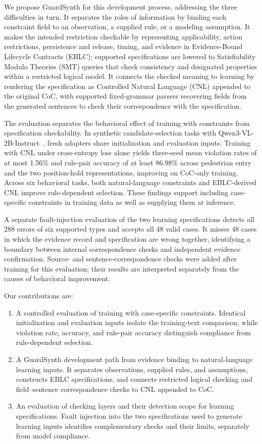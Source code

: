We propose GuardSynth for this development process, addressing the three
difficulties in turn. It separates the roles of information by binding each
constraint field to an observation, a supplied rule, or a modeling assumption.
It makes the intended restriction checkable by representing applicability,
action restrictions, persistence and release, timing, and evidence in
Evidence-Bound Lifecycle Contracts (EBLC); supported specifications are lowered
to Satisfiability Modulo Theories (SMT) queries that check consistency and
designated properties within a restricted logical model. It connects the
checked meaning to learning by rendering the specification as Controlled
Natural Language (CNL) appended to the original CoC, with supported
fixed-grammar parsers recovering fields from the generated sentences to check
their correspondence with the specification.

The evaluation separates the behavioral effect of training with constraints
from specification checkability. In synthetic candidate-selection tasks with
Qwen3-VL-2B-Instruct~\cite{qwen2025qwen3vl2b}, fresh adapters share initialization
and evaluation inputs. Training with CNL under cross-entropy loss alone yields
three-seed mean violation rates of at most 1.56\% and rule-pair accuracy of at
least 86.98\% across pedestrian entry and the two position-hold representations,
improving on CoC-only training. Across six behavioral tasks, both natural-language
constraints and EBLC-derived CNL improve rule-dependent selection. These
findings support including case-specific constraints in training data as well
as supplying them at inference.

A separate fault-injection evaluation of the two learning specifications
detects all 288 errors of six supported types and accepts all 48 valid cases.
It misses 48 cases in which the evidence record and specification are wrong
together, identifying a boundary between internal correspondence checks and
independent evidence confirmation. Source- and sentence-correspondence checks
were added after training for this evaluation; their results are interpreted
separately from the causes of behavioral improvement.

Our contributions are:
\begin{enumerate}
\item A controlled evaluation of training with case-specific constraints.
Identical initialization and evaluation inputs isolate the training-text
comparison, while violation rate, accuracy, and rule-pair accuracy distinguish
compliance from rule-dependent selection.
\item A GuardSynth development path from evidence binding to natural-language
learning inputs. It separates observations, supplied rules, and assumptions,
constructs EBLC specifications, and connects restricted logical checking and
field--sentence correspondence checks to CNL appended to CoC.
\item An evaluation of checking layers and their detection scope for learning
specifications. Fault injection into the two specifications used to generate
learning inputs identifies complementary checks and their limits, separately
from model compliance.
\end{enumerate}

